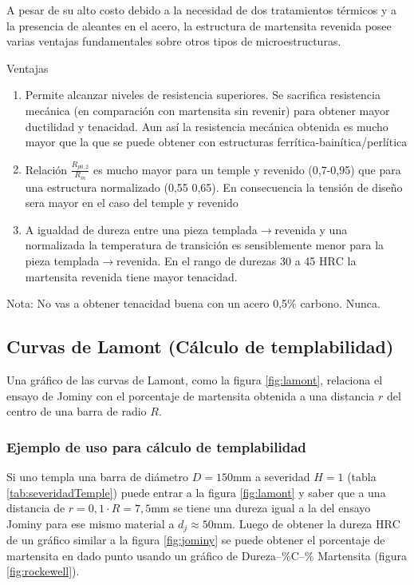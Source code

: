 \documentclass{article}
\newcommand{\HRC}{\ensuremath{\mathrm{HRC}}}
\newcommand{\goright}{\ensuremath{\rightarrow}}
\begin{document}
A pesar de su alto costo debido a la necesidad de dos tratamientos térmicos y a la presencia de aleantes en el acero, la estructura de martensita revenida posee varias ventajas fundamentales sobre otros tipos de microestructuras.


Ventajas
\begin{enumerate}
    \item Permite alcanzar niveles de resistencia superiores. Se sacrifica resistencia mecánica (en comparaci\'on con martensita sin revenir) para obtener mayor ductilidad y tenacidad. Aun así la resistencia mecánica obtenida es mucho mayor que la que se puede obtener con estructuras ferrítica-bainítica/perlítica
    \item Relación $\frac{R_{p0,2}}{R_m}$ es mucho mayor para un temple y revenido (0,7-0,95) que para una estructura normalizado (0,55 0,65). En consecuencia la tensión de diseño sera mayor en el caso del temple y revenido
    \item A igualdad de dureza entre una pieza templada\goright{}revenida y una normalizada la temperatura de transición es sensiblemente menor para la pieza templada\goright{}revenida. En el rango de durezas 30 a 45 $\HRC$ la martensita revenida tiene mayor tenacidad.
\end{enumerate}
Nota: No vas a obtener tenacidad buena con un acero 0,5\% carbono. Nunca.

\subsection{Curvas de Lamont (Cálculo de templabilidad)}
Una gráfico de las curvas de Lamont, como la figura \ref{fig:lamont}, relaciona el ensayo de Jominy con el porcentaje de martensita obtenida a una distancia $r$ del centro de una barra de radio $R$. 

\subsubsection{Ejemplo de uso para cálculo de templabilidad}
 Si uno templa una barra de diámetro $D=150$mm a severidad $H=1$ (tabla \ref{tab:severidadTemple}) puede entrar a la figura \ref{fig:lamont} y saber que a una distancia de $r=0,1\cdot R=7,5$mm se tiene una dureza igual a la del ensayo Jominy para ese mismo material a $d_j\approx50$mm. Luego de obtener la dureza \HRC{} de un gráfico similar a la figura \ref{fig:jominy} se puede obtener el porcentaje de martensita en dado punto usando un gráfico de Dureza--\%C--\% Martensita (figura \ref{fig:rockewell}).
 
\end{document}

